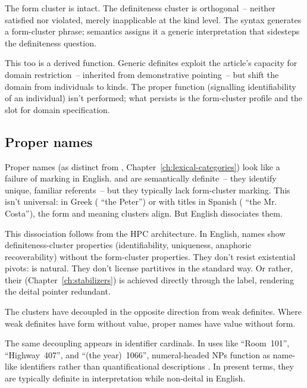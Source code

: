 The form cluster is intact. The definiteness cluster is orthogonal~-- neither satisfied nor violated, merely inapplicable at the kind level. The syntax generates a form-cluster phrase; semantics assigns it a generic interpretation that sidesteps the definiteness question.

This too is a derived function. Generic definites exploit the article's capacity for domain restriction~-- inherited from demonstrative pointing~-- but shift the domain from individuals to kinds. The proper function (signalling identifiability of an individual) isn't performed; what persists is the form-cluster profile and the slot for domain specification.

\subsection{Proper names}
\label{sec:10:proper-names}

Proper names (as distinct from , Chapter~\ref{ch:lexical-categories}) look like a failure of marking in English.  and  are semantically definite~-- they identify unique, familiar referents~-- but they typically lack form-cluster marking. This isn't universal: in Greek ( \enquote{the Peter}) or with titles in Spanish ( \enquote{the Mr. Costa}), the form and meaning clusters align. But English dissociates them.

This dissociation follows from the HPC architecture. In English, names show definiteness-cluster properties (identifiability, uniqueness, anaphoric recoverability) without the form-cluster properties. They don't resist existential pivots:  is natural. They don't license partitives in the standard way. Or rather, their  (Chapter~\ref{ch:stabilizers}) is achieved directly through the label, rendering the deital pointer redundant.

The clusters have decoupled in the opposite direction from weak definites. Where weak definites have form without value, proper names have value without form.

The same decoupling appears in identifier cardinals. In uses like \enquote{Room~101}, \enquote{Highway~407}, and \enquote{(the year)~1066}, numeral-headed NPs function as name-like identifiers rather than quantificational descriptions \citep{reynolds2026numerals}. In present terms, they are typically definite in interpretation while non-deital in English.

